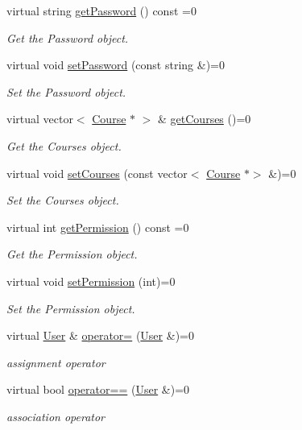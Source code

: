\begin{DoxyCompactItemize}
virtual string \hyperlink{classUser_a29d4b884ba9f2a3f28a77368c86239fd}{get\+Password} () const =0
\begin{DoxyCompactList}\small\item\em Get the Password object. \end{DoxyCompactList}\item 
virtual void \hyperlink{classUser_a809c17ec3427917ae2e641d171cb99d2}{set\+Password} (const string \&)=0
\begin{DoxyCompactList}\small\item\em Set the Password object. \end{DoxyCompactList}\item 
virtual vector$<$ \hyperlink{classCourse}{Course} $\ast$ $>$ \& \hyperlink{classUser_a72be855a1f58cc705591413a72a8e346}{get\+Courses} ()=0
\begin{DoxyCompactList}\small\item\em Get the Courses object. \end{DoxyCompactList}\item 
virtual void \hyperlink{classUser_a1b97c41fca71b2839d8acc57e9d006b2}{set\+Courses} (const vector$<$ \hyperlink{classCourse}{Course} $\ast$$>$ \&)=0
\begin{DoxyCompactList}\small\item\em Set the Courses object. \end{DoxyCompactList}\item 
virtual int \hyperlink{classUser_ae326f0c51a673f749ed57b9f0d0b723a}{get\+Permission} () const =0
\begin{DoxyCompactList}\small\item\em Get the Permission object. \end{DoxyCompactList}\item 
virtual void \hyperlink{classUser_ab6a6689e3581c70af166b2eb537df6fb}{set\+Permission} (int)=0
\begin{DoxyCompactList}\small\item\em Set the Permission object. \end{DoxyCompactList}\item 
virtual \hyperlink{classUser}{User} \& \hyperlink{classUser_afd7134b455781d42362cf5fd0d5d2e68}{operator=} (\hyperlink{classUser}{User} \&)=0
\begin{DoxyCompactList}\small\item\em assignment operator \end{DoxyCompactList}\item 
virtual bool \hyperlink{classUser_a461783a03e5a694a2cdd80fba7b18459}{operator==} (\hyperlink{classUser}{User} \&)=0
\begin{DoxyCompactList}\small\item\em association operator \end{DoxyCompactList}\end{DoxyCompactItemize}


